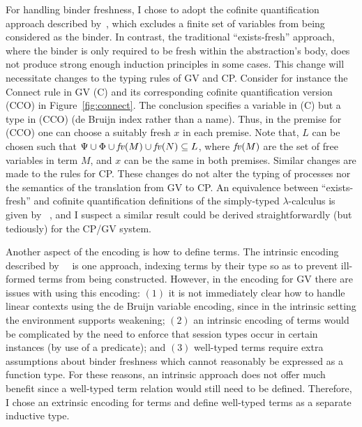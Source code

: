 \documentclass{mpaper}
\begin{document}


For handling binder freshness, I chose to adopt the cofinite quantification
approach described by~\citeauthor{Aydemir:2008:EFM}, which excludes a finite
set of variables from being considered as the binder. In contrast, the
traditional ``exists-fresh'' approach, where the binder is only required to be
fresh within the abstraction's body, does not produce strong enough induction
principles in some cases. This change will necessitate changes to the typing
rules of GV and CP. Consider for instance the Connect rule in GV (C) and its
corresponding cofinite quantification version (CCO) in
Figure~\ref{fig:connect}. The conclusion specifies a variable in (C) but a
type in (CCO) (de Bruijn index rather than a name). Thus, in the premise for
(CCO) one can choose a suitably fresh $x$ in each premise. Note that, $L$ can
be chosen such that $\Psi \cup \Phi \cup \mathit{fv}(M) \cup \mathit{fv}(N) \subseteq L$,
where $\mathit{fv}(M)$ are the set of free variables in term $M$, and $x$ can be the
same in both premises. Similar changes are made to the rules for CP. These
changes do not alter the typing of processes nor the semantics of the
translation from GV to CP. An equivalence between ``exists-fresh'' and
cofinite quantification definitions of the simply-typed $\lambda$-calculus is
given by \citeauthor{Aydemir:2008:EFM}~\cite{Aydemir:2008:EFM}, and I suspect
a similar result could be derived straightforwardly (but tediously) for the
CP/GV system.

Another aspect of the encoding is how to define terms. The intrinsic encoding
described by~\citeauthor{Benton:2012:STT}~\cite{Benton:2012:STT} is one
approach, indexing terms by their type so as to prevent ill-formed terms from
being constructed. However, in the encoding for GV there are issues with using
this encoding: $(1)$ it is not immediately clear how to handle linear contexts
using the de Bruijn variable encoding, since in the intrinsic setting the
environment supports weakening; $(2)$ an intrinsic encoding of terms would be
complicated by the need to enforce that session types occur in certain
instances (by use of a predicate); and $(3)$ well-typed terms require extra
assumptions about binder freshness which cannot reasonably be expressed as a
function type. For these reasons, an intrinsic approach does not offer much
benefit since a well-typed term relation would still need to be
defined. Therefore, I chose an extrinsic encoding for terms and define
well-typed terms as a separate inductive type.
\end{document}

